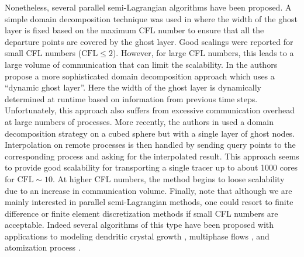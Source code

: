 Nonetheless, several parallel semi-Lagrangian algorithms have been proposed. A simple domain decomposition technique was used in \cite{Thomas;Cote:95:Massively-parallel-s} where the width of the ghost layer is fixed based on the maximum CFL number to ensure that all the departure points are covered by the ghost layer. Good scalings were reported for small CFL numbers ($\text{CFL} \le 2$). However, for large CFL numbers, this leads to a large volume of communication that can limit the scalability. In \cite{Drake;Foster;Michalakes;etal:95:Design-and-performan} the authors propose a more sophisticated domain decomposition approach which uses a ``dynamic ghost layer''. Here the width of the ghost layer is dynamically determined at runtime based on information from previous time steps. Unfortunately, this approach also suffers from excessive communication overhead at large numbers of processes. More recently, the authors in \cite{White-III;Dongarra:11:High-performance-hig} used a domain decomposition strategy on a cubed sphere but with a single layer of ghost nodes. Interpolation on remote processes is then handled by sending query points to the corresponding process and asking for the interpolated result. This approach seems to provide good scalability for transporting a single tracer up to about 1000 cores for $\text{CFL} \sim 10$. At higher CFL numbers, the method begins to loose scalability due to an increase in communication volume. Finally, note that although we are mainly interested in parallel semi-Lagrangian methods, one could resort to finite difference or finite element discretization methods if small CFL numbers are acceptable. Indeed several algorithms of this type have been proposed with applications to modeling dendritic crystal growth \cite{Wang;Chang;Kale;etal:06:Parallelization-of-a}, multiphase flows \cite{Sussman:05:A-parallelized-adapt, Fortmeier;Bucker:11:A-parallel-strategy-, Rodriguez;Sahni;Lahey-Jr;etal:13:A-parallel-adaptive-}, and atomization process \cite{Herrmann:10:A-parallel-Eulerian-}.

